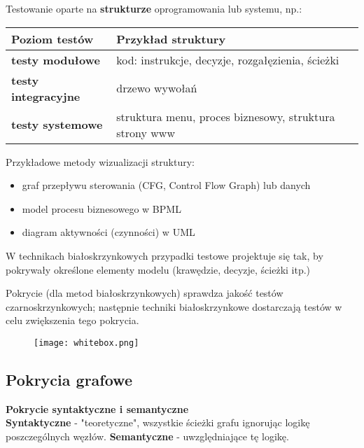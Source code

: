 \documentclass[../main.tex]{subfiles}
\begin{document}
    Testowanie oparte na \textbf{strukturze} oprogramowania lub systemu, np.:

    \begin{tabular}{p{4cm} | p{8cm}}
        \textbf{Poziom testów} & \textbf{Przykład struktury}\\
        \hline
        \textbf{testy modułowe} & kod: instrukcje, decyzje, rozgałęzienia, ścieżki\\
        \textbf{testy integracyjne} & drzewo wywołań\\
        \textbf{testy systemowe} & struktura menu, proces biznesowy, struktura strony www\\
    \end{tabular}


    Przykładowe metody wizualizacji struktury:
    \begin{itemize}
        \item graf przepływu sterowania (CFG, Control Flow Graph) lub danych
        \item model procesu biznesowego w BPML
        \item diagram aktywności (czynności) w UML
    \end{itemize}
    W technikach białoskrzynkowych przypadki testowe projektuje się tak, by
    pokrywały określone elementy modelu (krawędzie, decyzje, ścieżki itp.)

    Pokrycie (dla metod białoskrzynkowych) sprawdza jakość testów czarnoskrzynkowych; następnie techniki
    białoskrzynkowe dostarczają testów w celu zwiększenia tego pokrycia.


    \begin{figure}[H]
        \texttt{[image: whitebox.png]}
    \end{figure}


    \subsection{Pokrycia grafowe}

    \textbf{Pokrycie syntaktyczne i semantyczne}\\
    \textbf{Syntaktyczne} - "teoretyczne", wszystkie ścieżki grafu ignorując logikę poszczególnych węzłów.
    \textbf{Semantyczne} - uwzględniające tę logikę.
\end{document}
